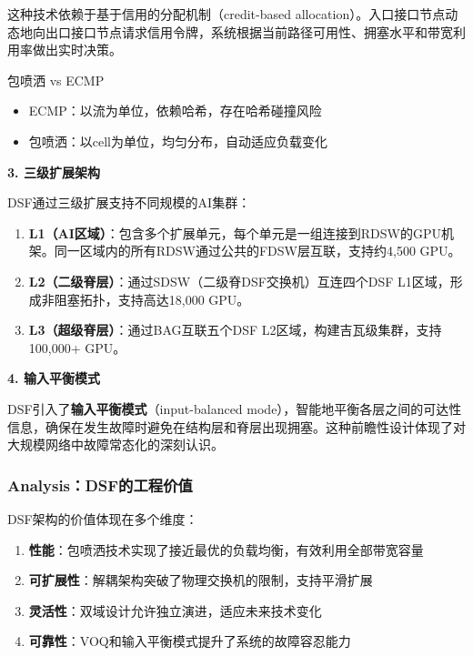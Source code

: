 这种技术依赖于基于信用的分配机制（credit-based allocation）。入口接口节点动态地向出口接口节点请求信用令牌，系统根据当前路径可用性、拥塞水平和带宽利用率做出实时决策。

\begin{insightbox}{包喷洒 vs ECMP}
\begin{itemize}
    \item ECMP：以流为单位，依赖哈希，存在哈希碰撞风险
    \item 包喷洒：以cell为单位，均匀分布，自动适应负载变化
\end{itemize}
\end{insightbox}

\textbf{3. 三级扩展架构}

DSF通过三级扩展支持不同规模的AI集群：

\begin{enumerate}
    \item \textbf{L1（AI区域）}：包含多个扩展单元，每个单元是一组连接到RDSW的GPU机架。同一区域内的所有RDSW通过公共的FDSW层互联，支持约4,500 GPU。
    
    \item \textbf{L2（二级脊层）}：通过SDSW（二级脊DSF交换机）互连四个DSF L1区域，形成非阻塞拓扑，支持高达18,000 GPU。
    
    \item \textbf{L3（超级脊层）}：通过BAG互联五个DSF L2区域，构建吉瓦级集群，支持100,000+ GPU。
\end{enumerate}

\textbf{4. 输入平衡模式}

DSF引入了\textbf{输入平衡模式}（input-balanced mode），智能地平衡各层之间的可达性信息，确保在发生故障时避免在结构层和脊层出现拥塞。这种前瞻性设计体现了对大规模网络中故障常态化的深刻认识。

\subsubsection{Analysis：DSF的工程价值}

DSF架构的价值体现在多个维度：

\begin{enumerate}
    \item \textbf{性能}：包喷洒技术实现了接近最优的负载均衡，有效利用全部带宽容量
    \item \textbf{可扩展性}：解耦架构突破了物理交换机的限制，支持平滑扩展
    \item \textbf{灵活性}：双域设计允许独立演进，适应未来技术变化
    \item \textbf{可靠性}：VOQ和输入平衡模式提升了系统的故障容忍能力
\end{enumerate}

